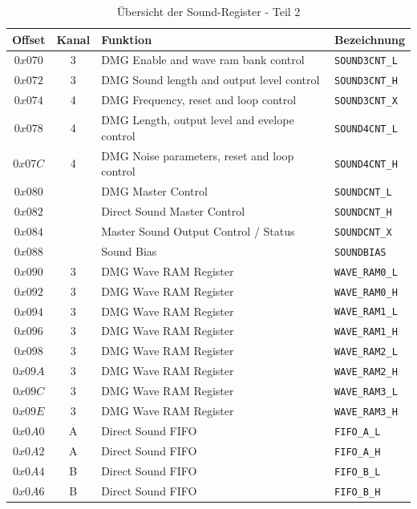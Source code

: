 \documentclass[11pt,a4paper]{scrartcl}
\begin{document}
\newpage

\begin{table}[h]
    \centering
    \begin{tabular}{ c | c | p{10cm} | l }    
        \textbf{Offset} & \textbf{Kanal} & \textbf{Funktion} & \textbf{Bezeichnung} \\
        \hline
        $0x070$ & 3 & DMG Enable and wave ram bank control & \verb|SOUND3CNT_L| \\
        \hline
        $0x072$ & 3 & DMG Sound length and output level control & \verb|SOUND3CNT_H| \\
        \hline
        $0x074$ & 4 & DMG Frequency, reset and loop control & \verb|SOUND3CNT_X| \\
        \hline
        $0x078$ & 4 & DMG Length, output level and evelope control & \verb|SOUND4CNT_L| \\
        \hline
        $0x07C$ & 4 & DMG Noise parameters, reset and loop control & \verb|SOUND4CNT_H| \\
        \hline
        $0x080$ & & DMG Master Control & \verb|SOUNDCNT_L| \\
        \hline
        $0x082$ & & Direct Sound Master Control & \verb|SOUNDCNT_H| \\
        \hline
        $0x084$ & & Master Sound Output Control / Status & \verb|SOUNDCNT_X| \\
        \hline
        $0x088$ & & Sound Bias & \verb|SOUNDBIAS| \\
        \hline
        $0x090$ & 3 & DMG Wave RAM Register & \verb|WAVE_RAM0_L| \\
        \hline
        $0x092$ & 3 & DMG Wave RAM Register & \verb|WAVE_RAM0_H| \\
        \hline
        $0x094$ & 3 & DMG Wave RAM Register & \verb|WAVE_RAM1_L| \\
        \hline
        $0x096$ & 3 & DMG Wave RAM Register & \verb|WAVE_RAM1_H| \\
        \hline
        $0x098$ & 3 & DMG Wave RAM Register & \verb|WAVE_RAM2_L| \\
        \hline
        $0x09A$ & 3 & DMG Wave RAM Register & \verb|WAVE_RAM2_H| \\
        \hline
        $0x09C$ & 3 & DMG Wave RAM Register & \verb|WAVE_RAM3_L| \\
        \hline
        $0x09E$ & 3 & DMG Wave RAM Register & \verb|WAVE_RAM3_H| \\
        \hline
        $0x0A0$ & A & Direct Sound FIFO & \verb|FIFO_A_L| \\
        \hline
        $0x0A2$ & A & Direct Sound FIFO & \verb|FIFO_A_H| \\
        \hline
        $0x0A4$ & B & Direct Sound FIFO & \verb|FIFO_B_L| \\
        \hline
        $0x0A6$ & B & Direct Sound FIFO & \verb|FIFO_B_H| \\
    \end{tabular}
    \caption{\"Ubersicht der Sound-Register - Teil 2}
    \label{table:SoundRegister2}
\end{table}
\end{document}
